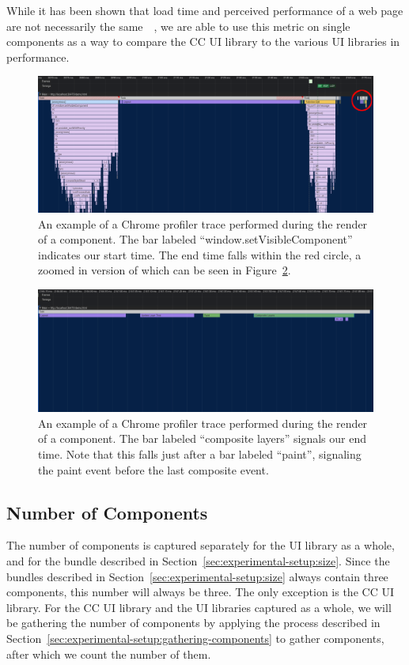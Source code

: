 While it has been shown that load time and perceived performance of a web page are not necessarily the same~\cite{nathan2018measuring}~\cite{gao2017perceived}, we are able to use this metric on single components as a way to compare the CC UI library to the various UI libraries in performance.

\begin{figure}[h]
	\includegraphics[width=\columnwidth]{figures/experimental-setup/render-time-highlighted.png}
	\caption{An example of a Chrome profiler trace performed during the render of a component. The bar labeled ``window.setVisibleComponent'' indicates our start time. The end time falls within the red circle, a zoomed in version of which can be seen in Figure~\ref{fig:experimental-setup:render-time-end}.}
	\label{fig:experimental-setup:render-time-start}
	\centering
\end{figure}

\begin{figure}[h]
	\includegraphics[width=\columnwidth]{figures/experimental-setup/render-time-zoomed.png}
	\caption{An example of a Chrome profiler trace performed during the render of a component. The bar labeled ``composite layers'' signals our end time. Note that this falls just after a bar labeled ``paint'', signaling the paint event before the last composite event.}
	\label{fig:experimental-setup:render-time-end}
	\centering
\end{figure}

\subsection{Number of Components}
The number of components is captured separately for the UI library as a whole, and for the bundle described in Section~\ref{sec:experimental-setup:size}. Since the bundles described in Section~\ref{sec:experimental-setup:size} always contain three components, this number will always be three. The only exception is the CC UI library. For the CC UI library and the UI libraries captured as a whole, we will be gathering the number of components by applying the process described in Section~\ref{sec:experimental-setup:gathering-components} to gather components, after which we count the number of them.